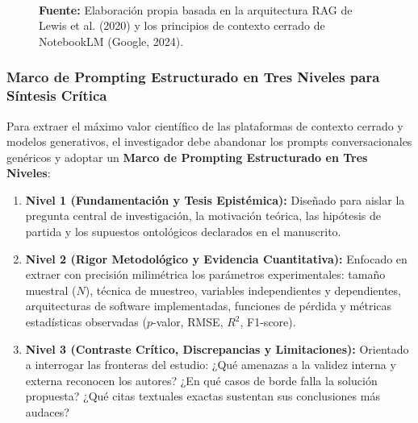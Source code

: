 \begin{figure}[htpb!]
\begin{tcolorbox}[colback=white, colframe=unmsm_gold, arc=3pt, boxrule=0.8pt, top=0.3cm, bottom=0.3cm, left=0.4cm, right=0.4cm]
{%
}\\[0.25cm]
\raggedright
\scriptsize \textbf{Fuente:} Elaboración propia basada en la arquitectura RAG de Lewis et al. (2020) y los principios de contexto cerrado de NotebookLM (Google, 2024).
\end{tcolorbox}
\vspace{0.15cm}
\end{figure}

\subsubsection{Marco de Prompting Estructurado en Tres Niveles para Síntesis Crítica}

Para extraer el máximo valor científico de las plataformas de contexto cerrado y modelos generativos, el investigador debe abandonar los prompts conversacionales genéricos y adoptar un \textbf{Marco de Prompting Estructurado en Tres Niveles}:

\begin{enumerate}
    \item \textbf{Nivel 1 (Fundamentación y Tesis Epistémica):} Diseñado para aislar la pregunta central de investigación, la motivación teórica, las hipótesis de partida y los supuestos ontológicos declarados en el manuscrito.
    \item \textbf{Nivel 2 (Rigor Metodológico y Evidencia Cuantitativa):} Enfocado en extraer con precisión milimétrica los parámetros experimentales: tamaño muestral ($N$), técnica de muestreo, variables independientes y dependientes, arquitecturas de software implementadas, funciones de pérdida y métricas estadísticas observadas ($p$-valor, RMSE, $R^2$, F1-score).
    \item \textbf{Nivel 3 (Contraste Crítico, Discrepancias y Limitaciones):} Orientado a interrogar las fronteras del estudio: ¿Qué amenazas a la validez interna y externa reconocen los autores? ¿En qué casos de borde falla la solución propuesta? ¿Qué citas textuales exactas sustentan sus conclusiones más audaces?
\end{enumerate}

